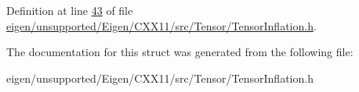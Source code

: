 Definition at line \hyperlink{eigen_2unsupported_2_eigen_2_c_x_x11_2src_2_tensor_2_tensor_inflation_8h_source_l00043}{43} of file \hyperlink{eigen_2unsupported_2_eigen_2_c_x_x11_2src_2_tensor_2_tensor_inflation_8h_source}{eigen/unsupported/\+Eigen/\+C\+X\+X11/src/\+Tensor/\+Tensor\+Inflation.\+h}.



The documentation for this struct was generated from the following file\+:\begin{DoxyCompactItemize}
\item 
eigen/unsupported/\+Eigen/\+C\+X\+X11/src/\+Tensor/\+Tensor\+Inflation.\+h\end{DoxyCompactItemize}
